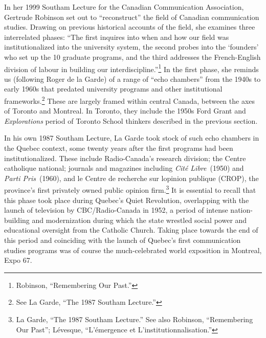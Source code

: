 \documentclass{tufte-handout}
\begin{document}
In her 1999 Southam Lecture for the Canadian Communication Association,
Gertrude Robinson set out to ``reconstruct'' the field of Canadian
communication studies. Drawing on previous historical accounts of the
field, she examines three interrelated phases: ``The first inquires into
when and how our field was institutionalized into the university system,
the second probes into the `founders' who set up the 10 graduate
programs, and the third addresses the French-English division of labour
in building our interdiscipline.''\footnote{Robinson, ``Remembering Our
  Past.''} In the first phase, she reminds us (following Roger de la
Garde) of a range of ``echo chambers'' from the 1940s to early 1960s
that predated university programs and other institutional
frameworks.\footnote{See La Garde, ``The 1987 Southam Lecture.''} These
are largely framed within central Canada, between the axes of Toronto
and Montreal. In Toronto, they include the 1950s Ford Grant and
\emph{Explorations} period of Toronto School thinkers described in the
previous section.

In his own 1987 Southam Lecture, La Garde took stock of such echo
chambers in the Quebec context, some twenty years after the first
programs had been institutionalized. These include Radio-Canada's
research division; the Centre catholique national; journals and
magazines including \emph{Cité Libre}~(1950) and \emph{Parti
Pris}~(1960), and le Centre de recherche sur l\textquotesingle opinion
publique (CROP), the province's first privately owned public opinion
firm.\footnote{La Garde, ``The 1987 Southam Lecture.'' See also
  Robinson, ``Remembering Our Past''; Lévesque, ``L'émergence et
  L'institutionnalisation.''} It is essential to recall that this phase
took place during Quebec's Quiet Revolution, overlapping with the launch
of television by CBC/Radio-Canada in 1952, a period of intense
nation-building and modernization during which the state wrestled social
power and educational oversight from the Catholic Church. Taking place
towards the end of this period and coinciding with the launch of
Quebec's first communication studies programs was of course the
much-celebrated world exposition in Montreal, Expo 67.
\end{document}
